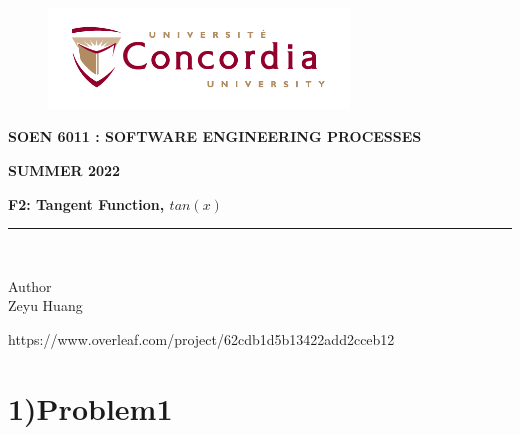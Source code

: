 \documentclass[letterpaper, 11pt]{report}
\begin{document}
\begin{titlepage}
\vspace*{0.7in}
\begin{center}
\begin{figure}[htb]
\begin{center}
\includegraphics[width=8cm]{univ_logo}
\end{center}
\end{figure}
\vspace*{0.3in}
\begin{Large}
\textbf{SOEN 6011 : SOFTWARE ENGINEERING PROCESSES} \\
\end{Large}
\vspace*{0.1in}
\begin{Large}
\textbf{SUMMER 2022} \\
\end{Large}
\vspace*{0.9in}
\begin{Large}
\textbf{F2: Tangent Function, $tan(x)$} \\
\end{Large}
\vspace*{0.625in}
\rule{80mm}{0.1mm}\\
\vspace*{0.1in}
\begin{large}
Author \\
\vspace*{0.1in}
Zeyu Huang\\

\vspace*{0.3in}
\date{\normalsize\today} 
\end{large}
\end{center}
\begin{center}
https://www.overleaf.com/project/62cdb1d5b13422add2cceb12\end{center}
\end{titlepage}
\tableofcontents
\newpage
{}
\section*{1)Problem1}
\end{document}
